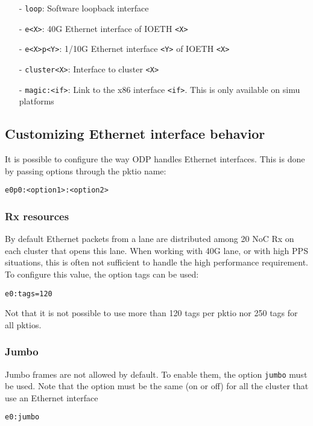 \documentclass{trkalray}
\begin{document}
\begin{itemize}
\item[-]{\texttt{loop}: Software loopback interface}
\item[-]{\texttt{e<X>}: 40G Ethernet interface of IOETH \texttt{<X>}}
\item[-]{\texttt{e<X>p<Y>}: 1/10G Ethernet interface \texttt{<Y>} of
  IOETH \texttt{<X>}}
\item[-]{\texttt{cluster<X>}: Interface to cluster \texttt{<X>}}
\item[-]{\texttt{magic:<if>}: Link to the x86 interface
  \texttt{<if>}. This is only available on simu platforms}
\end{itemize}

\subsection{Customizing Ethernet interface behavior}

It is possible to configure the way ODP handles Ethernet interfaces.
This is done by passing options through the pktio name:
\begin{lstlisting}
e0p0:<option1>:<option2>
\end{lstlisting}

\subsubsection{Rx resources}

By default Ethernet packets from a lane are distributed among 20 NoC Rx on each
cluster that opens this lane.
When working with 40G lane, or with high PPS situations, this is often
not sufficient to handle the high performance requirement.
To configure this value, the option tags can be used:
\begin{lstlisting}
e0:tags=120
\end{lstlisting}

Not that it is not possible to use more than 120 tags per pktio nor
250 tags for all pktios.

\subsubsection{Jumbo}

Jumbo frames are not allowed by default. To enable them, the option
\texttt{jumbo} must be used.
Note that the option must be the same (on or off) for all the cluster
that use an Ethernet interface

\begin{lstlisting}
e0:jumbo
\end{lstlisting}
\end{document}
